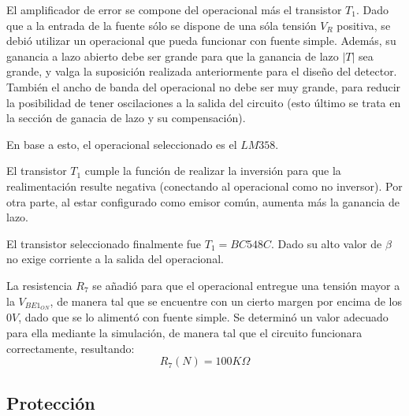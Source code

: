El amplificador de error se compone del operacional m\'as el transistor $T_1$. Dado que a la entrada de la fuente s\'olo se dispone de una s\'ola tensi\'on $V_R$ positiva, se debi\'o utilizar un operacional que pueda funcionar con fuente simple. Adem\'as, su ganancia a lazo abierto debe ser grande para que la ganancia de lazo $|T|$ sea grande, y valga la suposici\'on realizada anteriormente para el diseño del detector. Tambi\'en el ancho de banda del operacional no debe ser muy grande, para reducir la posibilidad de tener oscilaciones a la salida del circuito (esto \'ultimo se trata en la secci\'on de ganacia de lazo y su compensaci\'on).\par
En base a esto, el operacional seleccionado es el $LM358$.\par
El transistor $T_1$ cumple la funci\'on de realizar la inversi\'on para que la realimentaci\'on resulte negativa (conectando al operacional como no inversor). Por otra parte, al estar configurado como emisor com\'un, aumenta m\'as la ganancia de lazo. \par
El transistor seleccionado finalmente fue $T_1 = BC548C$. Dado su alto valor de $\beta$ no exige corriente a la salida del operacional.\par
La resistencia $R_7$ se añadi\'o para que el operacional entregue una tensi\'on mayor a la $V_{BE1_{ON}}$, de manera tal que se encuentre con un cierto margen por encima de los $0V$, dado que se lo aliment\'o con fuente simple. Se determin\'o un valor adecuado para ella mediante la simulaci\'on, de manera tal que el circuito funcionara correctamente, resultando: 
\[
R_7(N) = 100K\Omega
\]
\newpage

\subsection{Protecci\'on}

